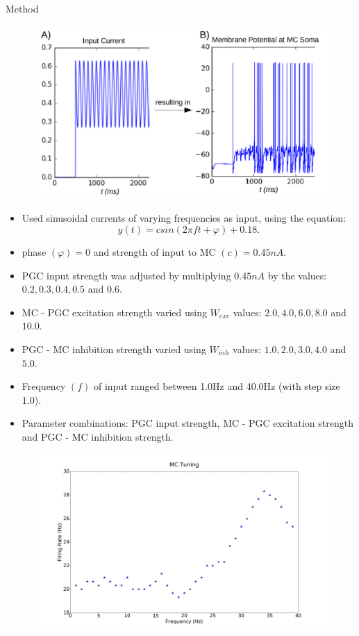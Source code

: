 \documentclass[final,hyperref={pdfpagelabels=false}]{beamer}
\begin{document}
\begin{frame}{}
\begin{columns}[t]
\begin{column}{.48\linewidth}
\begin{block}{Method}
 
\begin{figure}
\center
\includegraphics[scale=0.5]{images/Figure2AB}
\end{figure}

\begin{itemize}
\item Used sinusoidal currents of varying frequencies as input, using the equation:
\begin{equation}
y(t) = csin(2 \pi ft + \varphi) + 0.18. 
\end{equation}
\item phase $(\varphi) = 0$ and strength of input to MC $(c) = 0.45nA$.
\item PGC input strength was adjusted by multiplying $0.45nA$ by the values: $0.2, 0.3, 0.4, 0.5$ and $0.6$.
\item MC - PGC excitation strength varied using $W_{exc}$ values: $2.0, 4.0, 6.0, 8.0$ and $10.0$.
\item PGC - MC inhibition strength varied using $W_{inh}$ values: $1.0, 2.0, 3.0, 4.0$ and $5.0$.
\item Frequency $(f)$ of input ranged between 1.0Hz and 40.0Hz (with step size 1.0).
\item Parameter combinations: PGC input strength, MC - PGC excitation strength and PGC - MC inhibition strength.
\end{itemize}

\begin{figure}
\center
\includegraphics[scale=0.3]{images/Figure2C}
\end{figure}


\end{block}
\end{column}
\end{columns}
\end{frame}
\end{document}
